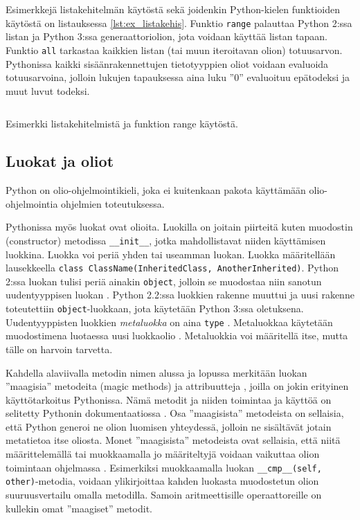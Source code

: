 \documentclass[finnish]{tktltiki2}
\theoremstyle{definition}
\theoremstyle{remark}
\begin{document}
Esimerkkejä listakehitelmän käytöstä sekä joidenkin Python-kielen funktioiden käytöstä on listauksessa \ref{lst:ex_listakehis}. Funktio \verb|range| palauttaa Python 2:ssa listan ja Python 3:ssa generaattoriolion, jota voidaan käyttää listan tapaan. Funktio \verb|all| tarkastaa kaikkien listan (tai muun iteroitavan olion) totuusarvon. Pythonissa kaikki sisäänrakennettujen tietotyyppien oliot voidaan evaluoida totuusarvoina, jolloin lukujen tapauksessa aina luku ''0'' evaluoituu epätodeksi ja muut luvut todeksi.

\begin{listing}
    \inputminted[linenos]{python}{code/luvut.py}
    \caption{Esimerkki listakehitelmistä ja funktion range käytöstä.}
    \label{lst:ex_listakehis}
\end{listing}


\subsection{Luokat ja oliot}

Python on olio-ohjelmointikieli, joka ei kuitenkaan pakota käyttämään olio-ohjelmointia ohjelmien toteutuksessa. 

Pythonissa myös luokat ovat olioita. Luokilla on joitain piirteitä kuten muodostin (constructor) metodissa \verb|__init__|, jotka mahdollistavat niiden käyttämisen luokkina. Luokka voi periä yhden tai useamman luokan. Luokka määritellään lausekkeella \lstinline|class ClassName(InheritedClass, AnotherInherited)|. Python 2:ssa luokan tulisi periä ainakin \verb|object|, jolloin se muodostaa niin sanotun uudentyyppisen luokan \cite{martelli2006python}. Python 2.2:ssa luokkien rakenne muuttui ja uusi rakenne toteutettiin \verb|object|-luokkaan, jota käytetään Python 3:ssa oletuksena. Uudentyyppisten luokkien \emph{metaluokka} on aina \verb|type| \cite{martelli2006python}. Metaluokkaa käytetään muodostimena luotaessa uusi luokkaolio \cite{MetaprogP3}. Metaluokkia voi määritellä itse, mutta tälle on harvoin tarvetta.

Kahdella alaviivalla metodin nimen alussa ja lopussa merkitään luokan ''maagisia'' metodeita (magic methods) ja attribuutteja \cite{martelli2006python}, joilla on jokin erityinen käyttötarkoitus Pythonissa. Nämä metodit ja niiden toimintaa ja käyttöä on selitetty Pythonin dokumentaatiossa \cite{magic-methods}. Osa ''maagisista'' metodeista on sellaisia, että Python generoi ne olion luomisen yhteydessä, jolloin ne sisältävät jotain metatietoa itse oliosta. Monet ''maagisista'' metodeista ovat sellaisia, että niitä määrittelemällä tai muokkaamalla jo määriteltyjä voidaan vaikuttaa olion toimintaan ohjelmassa \cite{magic-methods}. Esimerkiksi muokkaamalla luokan \verb|__cmp__(self, other)|-metodia, voidaan ylikirjoittaa kahden luokasta muodostetun olion suuruusvertailu omalla metodilla. Samoin aritmeettisille operaattoreille on kullekin omat ''maagiset'' metodit. 
\end{document}
